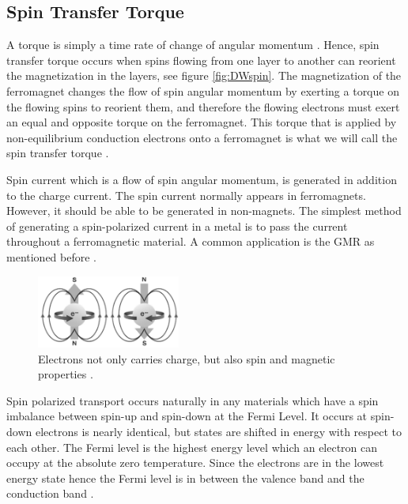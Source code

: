 \subsection{Spin Transfer Torque }

A torque is simply a time rate of change of angular momentum \cite{spintransfer}. Hence, spin transfer torque occurs when spins flowing from one layer to another can reorient the magnetization in the layers, see figure \ref{fig:DWspin}. The magnetization of the ferromagnet changes the flow of spin angular momentum by exerting a torque on the flowing spins to reorient them, and therefore the flowing electrons must exert an equal and opposite torque on the ferromagnet. This torque that is applied by non-equilibrium conduction electrons onto a ferromagnet is what we will call the spin transfer torque \cite{spintransfer}.

Spin current which is a flow of spin angular momentum, is generated in addition to the charge current. The spin current normally appears in ferromagnets. However, it should be able to be generated in non-magnets. The simplest method of generating a spin-polarized current in a metal is to pass the current throughout a ferromagnetic material. A common application is the GMR as mentioned before \cite{handbookspin}.

\begin{figure}[htbp]
	\centering
		\includegraphics[width=0.42\textwidth]{Figures/electron.png}
		\smallskip
	\caption[Electron carries spin, charge and magnetic]{Electrons not only carries charge, but also spin and magnetic properties \cite{spinimg}. }
	\label{fig:electron}
\end{figure}


Spin polarized transport occurs naturally in any materials which have a spin imbalance between spin-up and spin-down at the Fermi Level. It occurs at spin-down electrons is nearly identical, but states are shifted in energy with respect to each other. The Fermi level is the highest energy level which an electron can occupy at the absolute zero temperature. Since the electrons are in the lowest energy state hence the Fermi level is in between the valence band and the conduction band \cite{handbookspin}.

